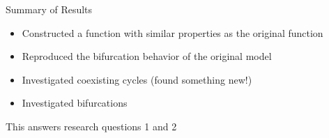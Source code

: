 \begin{frame}{Summary of Results}
    \begin{itemize}
        \item Constructed a function with similar properties as the original function
        \item Reproduced the bifurcation behavior of the original model
        \item Investigated coexisting cycles (found something new!)
        \item Investigated bifurcations
    \end{itemize}

    \pause
    \vspace{2em}
    This answers research questions 1 and 2
\end{frame}
